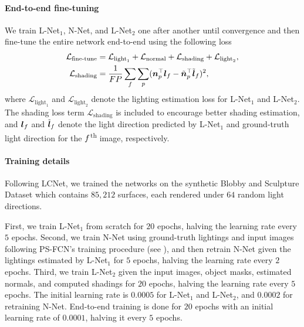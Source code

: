 \paragraph{End-to-end fine-tuning}
We train L-Net$_1$, N-Net, and L-Net$_2$ one after another until convergence and then fine-tune the entire network end-to-end using the following loss
\begin{align}
    \label{eq:finetune}
    \mathcal{L}_{\text{fine-tune}} & = \mathcal{L}_{\text{light}_1} + \mathcal{L}_{\text{normal}} + \mathcal{L}_{\text{shading}} + \mathcal{L}_{\text{light}_2}, \\
    \mathcal{L}_{\text{shading}} & = \frac{1}{FP} \sum_{f} \sum_{p}(\boldsymbol{n}_{p}^\top \boldsymbol{l}_{f} - \tilde{\boldsymbol{n}}_{p}^\top \tilde{\boldsymbol{l}}_{f})^2,
\end{align}
where \hbox{$\mathcal{L}_{\text{light}_1}$} and \hbox{$\mathcal{L}_{\text{light}_2}$} denote the lighting estimation loss for L-Net$_1$ and L-Net$_2$.
The shading loss term \hbox{$\mathcal{L}_{\text{shading}}$} is included to encourage better shading estimation,
and $\boldsymbol{l}_{f}$ and $\tilde{\boldsymbol{l}}_{f}$ denote the light direction predicted by L-Net$_1$ and ground-truth light direction for the $f$\textsuperscript{th} image, respectively.

\paragraph{Training details}
Following LCNet, we trained the networks on the synthetic Blobby and Sculpture Dataset which contains $85,212$ surfaces, each rendered under $64$ random light directions.

First, we train L-Net$_1$ from scratch for $20$ epochs, halving the learning rate every $5$ epochs.
Second, we train \mbox{N-Net} using ground-truth lightings and input images following PS-FCN's training procedure (see ), and then retrain N-Net given the lightings estimated by L-Net$_1$ for $5$ epochs, halving the learning rate every $2$ epochs.
Third, we train \mbox{L-Net$_2$} given the input images, object masks, estimated normals, and computed shadings for $20$ epochs, halving the learning rate every $5$ epochs.
The initial learning rate is $0.0005$ for L-Net$_1$ and L-Net$_2$, and $0.0002$ for retraining N-Net. 
End-to-end training is done for $20$ epochs with an initial learning rate of $0.0001$, halving it every $5$ epochs.

